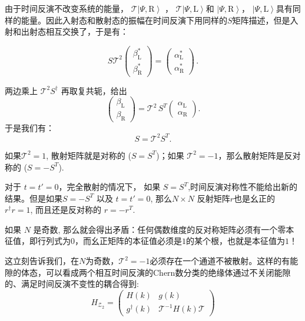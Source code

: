 \documentclass[supercite]{HustGraduPaper}
\begin{document}
由于时间反演不改变系统的能量， $\mathcal{T}\left|\Psi,\textrm{R}\right\rangle$ ， $\mathcal{T}\left|\Psi,\textrm{L}\right\rangle$和 $\left|\Psi,\textrm{R}\right\rangle$， $\left|\Psi,\textrm{L}\right\rangle$具有同样的能量。因此入射态和散射态的振幅在时间反演下用同样的$S$矩阵描述，但是入射和出射态相互交换了，于是有：

\begin{equation}
S\mathcal{T}^2 \begin{pmatrix}\beta^*_\textrm{L} \\ \beta^*_\textrm{R} \end{pmatrix} = \begin{pmatrix} \alpha^*_\textrm{L} \\ \alpha^*_\textrm{R} \end{pmatrix}\,. 
\end{equation}

两边乘上 $\mathcal{T}^2S^\dagger$ 再取复共轭，给出
\begin{equation}
\begin{pmatrix} \beta_\textrm{L} \\ \beta_\textrm{R} \end{pmatrix} = \mathcal{T}^2\,S^T \begin{pmatrix} \alpha_\textrm{L} \\ \alpha_\textrm{R} \end{pmatrix}. 
\end{equation}
于是我们有：
 \begin{equation}
S = \mathcal{T}^2 S^T. 
\end{equation}

如果$\mathcal{T}^2=1$, 散射矩阵就是对称的 ($S=S^T$)；如果 $\mathcal{T}^2=-1$，那么散射矩阵是反对称的 ($S=-S^T$).

对于 $t=t'=0$，完全散射的情况下，
如果 $S=S^T$,时间反演对称性不能给出新的结果。但是如果$S=-S^T$ 以及 $t=t'=0$, 那么$N\times N$ 反射矩阵$r$也是幺正的 $r^\dagger r=1$, 而且还是反对称的 $r=-r^T$.

如果 $N$ 是奇数, 那么就会得出矛盾：任何偶数维度的反对称矩阵必须有一个零本征值，即行列式为0，而幺正矩阵的本征值必须是$1$的某个根，也就是本征值为$1$！

这立刻告诉我们，在$N$为奇数，$\mathcal{T}^2 = -1$必须存在一个通道不被散射。这样的有能隙的体态，可以看成两个相互时间反演的Chern数分类的绝缘体通过不关闭能隙的、满足时间反演不变性的耦合得到:
\begin{equation}
H_{\mathcal{Z}_2} = \left(\begin{array}{cc}
H(k) & g(k) \\ 
g^\dagger(k) & \mathcal{T}^{-1}H(k)\mathcal{T}
\end{array} \right)
\end{equation}
\end{document}
